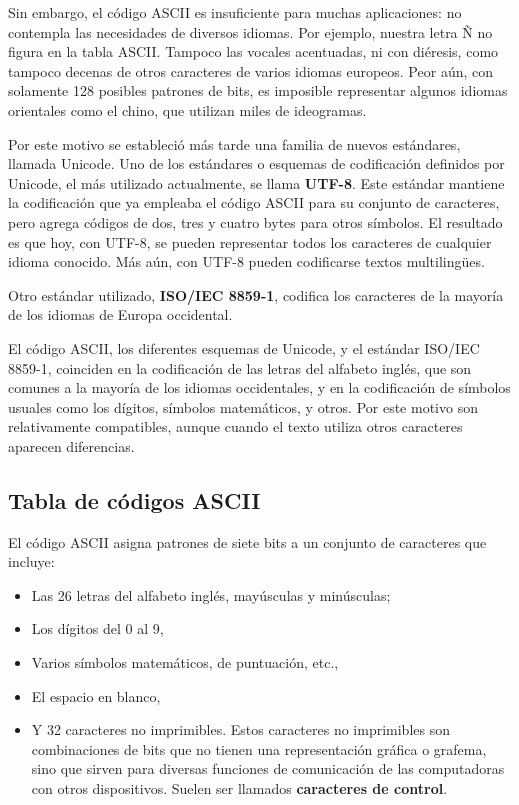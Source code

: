 \documentclass[spanish,a4paper,]{article}
\providecommand{\tightlist}{%
  \setlength{\itemsep}{0pt}\setlength{\parskip}{0pt}}
\begin{document}
Sin embargo, el código ASCII es insuficiente para muchas aplicaciones:
no contempla las necesidades de diversos idiomas. Por ejemplo, nuestra
letra Ñ no figura en la tabla ASCII. Tampoco las vocales acentuadas, ni
con diéresis, como tampoco decenas de otros caracteres de varios idiomas
europeos. Peor aún, con solamente 128 posibles patrones de bits, es
imposible representar algunos idiomas orientales como el chino, que
utilizan miles de ideogramas.

Por este motivo se estableció más tarde una familia de nuevos
estándares, llamada Unicode. Uno de los estándares o esquemas de
codificación definidos por Unicode, el más utilizado actualmente, se
llama \textbf{UTF-8}. Este estándar mantiene la codificación que ya
empleaba el código ASCII para su conjunto de caracteres, pero agrega
códigos de dos, tres y cuatro bytes para otros símbolos. El resultado es
que hoy, con UTF-8, se pueden representar todos los caracteres de
cualquier idioma conocido. Más aún, con UTF-8 pueden codificarse textos
multilingües.

Otro estándar utilizado, \textbf{ISO/IEC 8859-1}, codifica los
caracteres de la mayoría de los idiomas de Europa occidental.

El código ASCII, los diferentes esquemas de Unicode, y el estándar
ISO/IEC 8859-1, coinciden en la codificación de las letras del alfabeto
inglés, que son comunes a la mayoría de los idiomas occidentales, y en
la codificación de símbolos usuales como los dígitos, símbolos
matemáticos, y otros. Por este motivo son relativamente compatibles,
aunque cuando el texto utiliza otros caracteres aparecen diferencias.

\hypertarget{tabla-de-cuxf3digos-ascii}{%
\subsection{Tabla de códigos ASCII}\label{tabla-de-cuxf3digos-ascii}}

El código ASCII asigna patrones de siete bits a un conjunto de
caracteres que incluye:

\begin{itemize}
\tightlist
\item
  Las 26 letras del alfabeto inglés, mayúsculas y minúsculas;
\item
  Los dígitos del 0 al 9,
\item
  Varios símbolos matemáticos, de puntuación, etc.,
\item
  El espacio en blanco,
\item
  Y 32 caracteres no imprimibles. Estos caracteres no imprimibles son
  combinaciones de bits que no tienen una representación gráfica o
  grafema, sino que sirven para diversas funciones de comunicación de
  las computadoras con otros dispositivos. Suelen ser llamados
  \textbf{caracteres de control}.
\end{itemize}
\end{document}
